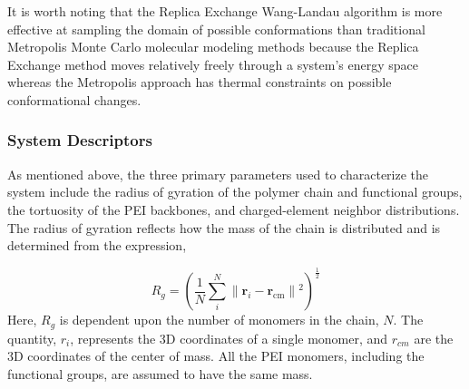 \documentclass[
journal=jcisd8, %
manuscript=article,
layout=twocolumn   %
]{achemso}
\begin{document}
It is worth noting that the Replica Exchange Wang-Landau algorithm is more effective at sampling the domain of possible conformations than traditional Metropolis Monte Carlo molecular modeling methods because the Replica Exchange method moves relatively freely through a system's energy space whereas the Metropolis approach has thermal constraints on possible conformational changes.


\subsubsection{System Descriptors}

As mentioned above, the three primary parameters used to characterize the system include the radius of gyration of the polymer chain and functional groups, the tortuosity of the PEI backbones, and charged-element neighbor distributions. The radius of gyration reflects how the mass of the chain is distributed and is determined from the expression,

\begin{equation}
R_g = {\left(\frac{1}{N} \sum_i^N   \lVert \boldsymbol{r}_i-\boldsymbol{r}_{\textrm{cm}}\rVert{}^2\right)}^{\frac{1}{2}}
\end{equation}
Here, $R_g$ is dependent upon the number of monomers in the chain, $N$. The quantity, $r_i$, represents the 3D coordinates of a single monomer, and $r_{cm}$ are the 3D coordinates of the center of mass. All the PEI monomers, including the functional groups, are assumed to have the same mass. %
\end{document}
